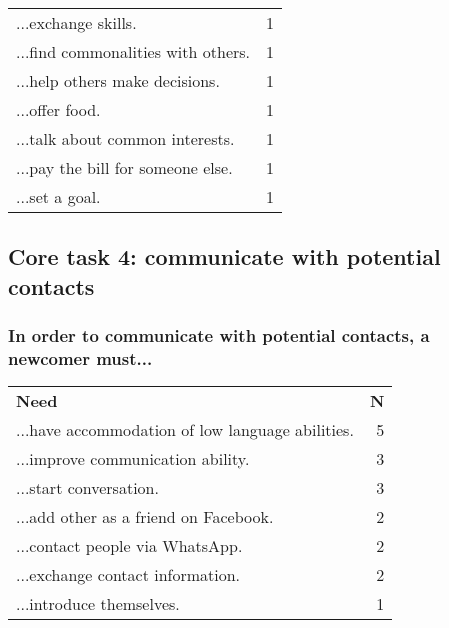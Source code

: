 \begin{longtable}{p{}r}
  ...exchange skills.                                                                                      & 1 \\
  ...find commonalities with others.                                                                       & 1 \\
  ...help others make decisions.                                                                           & 1 \\
  ...offer food.                                                                                           & 1 \\
  ...talk about common interests.                                                                          & 1 \\
  ...pay the bill for someone else.                                                                        & 1 \\
  ...set a goal.                                                                                           & 1 \\[12pt]
\end{longtable}

\subsection*{Core task 4: communicate with potential contacts}

\subsubsection*{In order to communicate with potential contacts, a newcomer must...}

\begin{longtable}{p{}r}
\textbf{Need}                                                                                              & \textbf{N} \\[12pt]
  ...have accommodation of low language abilities.                                                         & 5 \\
  ...improve communication ability.                                                                        & 3 \\
  ...start conversation.                                                                                   & 3 \\
  ...add other as a friend on Facebook.                                                                    & 2 \\
  ...contact people via WhatsApp.                                                                          & 2 \\
  ...exchange contact information.                                                                         & 2 \\
  ...introduce themselves.                                                                                 & 1 \\[12pt]
\end{longtable}

